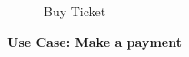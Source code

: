 \documentclass[a4paper,12pt]{report}
\begin{document}
\begin{figure}[!htb]
	\caption{\label{fig:Use Case Model : } Buy Ticket}	
\end{figure}


\vspace{0.5cm}
\textbf{\large Use Case: Make a payment}
\\
\end{document}
